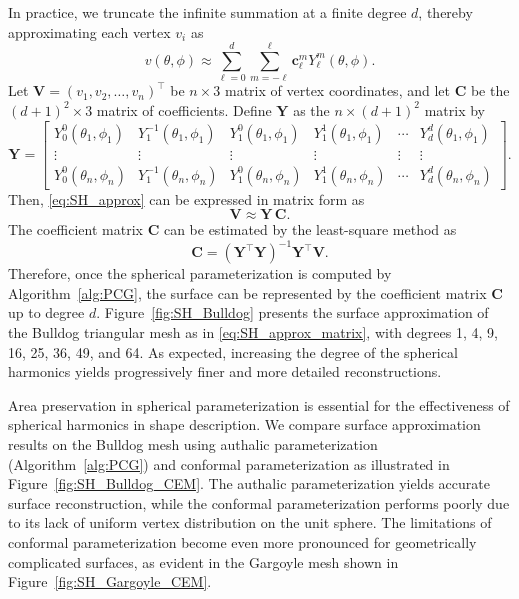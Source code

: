 \documentclass{article}
\numberwithin{equation}{section}
\def\bC{\mathbf{C}}
\def\bY{\mathbf{Y}}
\begin{document}
In practice, we truncate the infinite summation at a finite degree $d$, thereby approximating each vertex $v_i$ as 
\begin{equation}
v(\theta, \phi) \approx \sum_{\ell = 0}^d \sum_{m = -\ell}^\ell \mathbf{c}_\ell^m Y_\ell^m(\theta, \phi).
\label{eq:SH_approx}
\end{equation}
Let $\mathbf{V} = (v_1, v_2, \ldots, v_n)^\top$ be $n \times 3$ matrix of vertex coordinates, and let $\bC$ be the $(d+1)^2 \times 3$ matrix of coefficients. Define $\bY$ as the $n \times (d+1)^2$ matrix by
\[
\bY = 
\begin{bmatrix}
    Y_0^0(\theta_1, \phi_1)  &  Y_1^{-1}(\theta_1, \phi_1)  &  Y_1^{0}(\theta_1, \phi_1)  &  Y_1^{1}(\theta_1, \phi_1)  &  \cdots  & Y_d^{d}(\theta_1, \phi_1)\\
    \vdots  &  \vdots  &  \vdots  &  \vdots  &  \vdots  &  \vdots\\
    Y_0^0(\theta_n, \phi_n)  &  Y_1^{-1}(\theta_n, \phi_n)  &  Y_1^{0}(\theta_n, \phi_n)  &  Y_1^{1}(\theta_n, \phi_n)  &  \cdots  & Y_d^{d}(\theta_n, \phi_n)
\end{bmatrix}.
\]
Then, \eqref{eq:SH_approx} can be expressed in matrix form as
\begin{equation}
\mathbf{V} \approx \bY \, \bC.
\label{eq:SH_approx_matrix}
\end{equation}
The coefficient matrix $\bC$ can be estimated by the least-square method as 
\[
\bC = (\bY^\top \bY)^{-1} \bY^\top \mathbf{V}.
\]
Therefore, once the spherical parameterization is computed by Algorithm~\ref{alg:PCG}, the surface can be represented by the coefficient matrix $\bC$ up to degree $d$.
Figure~\ref{fig:SH_Bulldog} presents the surface approximation of the Bulldog triangular mesh as in \eqref{eq:SH_approx_matrix}, with degrees 1, 4, 9, 16, 25, 36, 49, and 64. As expected, increasing the degree of the spherical harmonics yields progressively finer and more detailed reconstructions.

Area preservation in spherical parameterization is essential for the effectiveness of spherical harmonics in shape description. We compare surface approximation results on the Bulldog mesh using authalic parameterization (Algorithm~\ref{alg:PCG}) and conformal parameterization \cite{ChLL15} as illustrated in Figure~\ref{fig:SH_Bulldog_CEM}. The authalic parameterization yields accurate surface reconstruction, while the conformal parameterization performs poorly due to its lack of uniform vertex distribution on the unit sphere.
The limitations of conformal parameterization become even more pronounced for geometrically complicated surfaces, as evident in the Gargoyle mesh shown in Figure~\ref{fig:SH_Gargoyle_CEM}.
\end{document}
